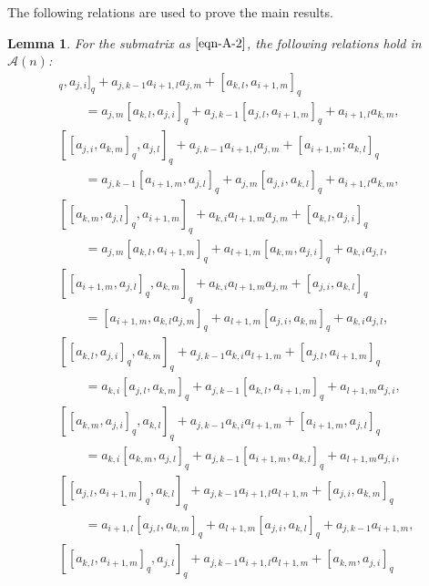 \documentclass[10pt,a4paper]{amsart}
\numberwithin{equation}{section}
\def\lr#1{\left[#1\right]}
\def\lq#1{\left[#1\right]_q}
\def\A{\mathscr{A}}
\newtheorem{Lemma}[Theorem]{Lemma}
\begin{document}
The following relations are used to prove the main results.
\begin{Lemma}\label{lem:eqn-1}
For the submatrix \smash{$\A_{j,k,i+1}^{i,l,m}$} as $\eqref{eqn-A-2}$, the following relations hold in $\A(n)$:
\begin{gather}%
 [\lr{a_{j,l}, a_{k,m}}_q, a_{j,i}]_q +a_{j,k-1}a_{i+1,l}a_{j,m} +\lr{a_{k,l}, a_{i+1,m}}_q \nonumber \\
 \qquad= a_{j,m}\lr{a_{k,l}, a_{j,i}}_q+a_{j,k-1}\lr{a_{j,l}, a_{i+1,m}}_q+a_{i+1,l}a_{k,m}, \tag{1.a} \label{eqn:1a}\\
 [\lr{a_{j,i}, a_{k,m}}_q, a_{j,l}]_q+a_{j,k-1}a_{i+1,l}a_{j,m}+\lr{a_{i+1,m}; a_{k,l}}_q \nonumber \\
 \qquad = a_{j,k-1}\lr{a_{i+1,m}, a_{j,l}}_q +a_{j,m}\lr{a_{j,i}, a_{k,l}}_q+a_{i+1,l}a_{k,m},\tag{1.b} \label{eqn:1b} \\
 [\lr{a_{k,m}, a_{j,l}}_q, a_{i+1,m}]_q+a_{k,i}a_{l+1,m}a_{j,m} +\lr{a_{k,l}, a_{j,i}}_q \nonumber \\
 \qquad = a_{j,m}\lr{a_{k,l}, a_{i+1,m}}_q+a_{l+1,m}\lr{a_{k,m}, a_{j,i}}_q +a_{k,i}a_{j,l}, \tag{2.a} \label{eqn:2a}\\
 [\lq{a_{i+1,m},a_{j,l}}, a_{k,m}]_q+a_{k,i}a_{l+1,m}a_{j,m} +\lr{a_{j,i}, a_{k,l}}_q\nonumber \\
 \qquad = \lr{a_{i+1,m}, a_{k,l}a_{j,m}}_q +a_{l+1,m}\lr{a_{j,i}, a_{k,m}}_q+a_{k,i}a_{j,l}, \tag{2.b} \label{eqn:2b}\\
 [\lr{a_{k,l}, a_{j,i}}_q, a_{k,m}]_q +a_{j,k-1}a_{k,i}a_{l+1,m}+\lr{a_{j,l}, a_{i+1,m}}_q \nonumber \\
 \qquad= a_{k,i}\lr{a_{j,l}, a_{k,m}}_q+a_{j,k-1}\lr{a_{k,l}, a_{i+1,m}}_q+a_{l+1,m}a_{j,i}, \tag{3.a} \label{eqn:3a}\\
 [\lr{a_{k,m}, a_{j,i}}_q, a_{k,l}]_q+a_{j,k-1}a_{k,i}a_{l+1,m}+\lr{a_{i+1,m}, a_{j,l}}_q \nonumber \\
 \qquad= a_{k,i}\lr{a_{k,m}, a_{j,l}}_q+a_{j,k-1}\lr{a_{i+1,m}, a_{k,l}}_q+a_{l+1,m}a_{j,i}, \tag{3.b} \label{eqn:3b}\\
 [\lq{a_{j,l},a_{i+1,m}}, a_{k,l}]_q+a_{j,k-1}a_{i+1,l}a_{l+1,m} +\lr{a_{j,i}, a_{k,m}}_q \nonumber \\
 \qquad= a_{i+1,l}\lr{a_{j,l}, a_{k,m}}_q +a_{l+1,m}\lr{a_{j,i}, a_{k,l}}_q +a_{j,k-1}a_{i+1,m},\tag{4.a} \\
 [\lq{a_{k,l},a_{i+1,m}}, a_{j,l}]_q +a_{j,k-1}a_{i+1,l}a_{l+1,m} +\lr{a_{k,m}, a_{j,i}}_q \nonumber \\

\end{gather}
\end{Lemma}
\end{document}
